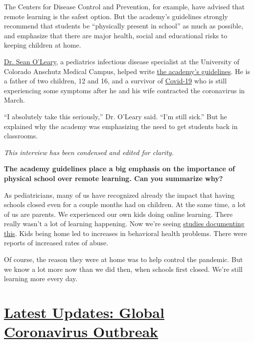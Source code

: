 The Centers for Disease Control and Prevention, for example, have
advised that remote learning is the safest option. But the academy's
guidelines strongly recommend that students be ``physically present in
school'' as much as possible, and emphasize that there are major health,
social and educational risks to keeping children at home.

\href{https://www.cudoctors.com/Find_A_Doctor/Profile/8599}{Dr. Sean
O'Leary}, a pediatrics infectious disease specialist at the University
of Colorado Anschutz Medical Campus, helped write
\href{https://services.aap.org/en/pages/2019-novel-coronavirus-covid-19-infections/clinical-guidance/covid-19-planning-considerations-return-to-in-person-education-in-schools/}{the
academy's guidelines}. He is a father of two children, 12 and 16, and a
survivor of
\href{https://www.nytimes.com/news-event/coronavirus}{Covid-19} who is
still experiencing some symptoms after he and his wife contracted the
coronavirus in March.

``I absolutely take this seriously,'' Dr. O'Leary said. ``I'm still
sick.'' But he explained why the academy was emphasizing the need to get
students back in classrooms.

\emph{This interview has been condensed and edited for clarity.}

\textbf{The academy guidelines place a big emphasis on the importance of
physical school over remote learning. Can you summarize why?}

As pediatricians, many of us have recognized already the impact that
having schools closed even for a couple months had on children. At the
same time, a lot of us are parents. We experienced our own kids doing
online learning. There really wasn't a lot of learning happening. Now
we're seeing
\href{https://www.nytimes.com/2020/06/05/us/coronavirus-education-lost-learning.html}{studies
documenting this}. Kids being home led to increases in behavioral health
problems. There were reports of increased rates of abuse.

Of course, the reason they were at home was to help control the
pandemic. But we know a lot more now than we did then, when schools
first closed. We're still learning more every day.

\hypertarget{latest-updates-global-coronavirus-outbreak}{%
\section{\texorpdfstring{\href{https://www.nytimes.com/2020/08/04/world/coronavirus-cases.html?action=click\&pgtype=Article\&state=default\&region=MAIN_CONTENT_1\&context=storylines_live_updates}{Latest
Updates: Global Coronavirus
Outbreak}}{Latest Updates: Global Coronavirus Outbreak}}\label{latest-updates-global-coronavirus-outbreak}}

